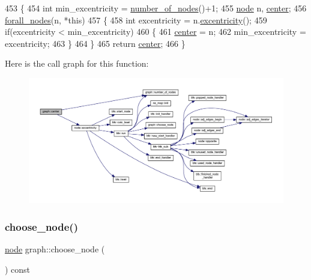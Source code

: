 \begin{DoxyCode}
453 \{
454     \textcolor{keywordtype}{int} min\_excentricity = \mbox{\hyperlink{classgraph_a42c78e0a9f115655e3ff0efe35ebfc4e}{number\_of\_nodes}}()+1;
455     \mbox{\hyperlink{classnode}{node}} n, \mbox{\hyperlink{classgraph_a351617e023b4b6833ab650a70fc086e7}{center}};
456     \mbox{\hyperlink{graph_8h_a1905bf4c6aa7167b9ee5a2e72f12ad2d}{forall\_nodes}}(n, *\textcolor{keyword}{this}) 
457     \{
458     \textcolor{keywordtype}{int} excentricity = n.\mbox{\hyperlink{classnode_aba6b3a48e7b951f08ebbbf3275f0ce9a}{excentricity}}();
459     \textcolor{keywordflow}{if}(excentricity < min\_excentricity) 
460     \{
461         \mbox{\hyperlink{classgraph_a351617e023b4b6833ab650a70fc086e7}{center}} = n;
462         min\_excentricity = excentricity;
463     \}
464     \}
465     \textcolor{keywordflow}{return} \mbox{\hyperlink{classgraph_a351617e023b4b6833ab650a70fc086e7}{center}};
466 \}
\end{DoxyCode}
Here is the call graph for this function\+:
\nopagebreak
\begin{figure}[H]
\begin{center}
\leavevmode
\includegraphics[width=350pt]{classgraph_a351617e023b4b6833ab650a70fc086e7_cgraph}
\end{center}
\end{figure}
\mbox{\label{classgraph_aec5c11c90a94ebd145f059a541db860e}} 
\subsubsection{\texorpdfstring{choose\+\_\+node()}{choose\_node()}}
{\footnotesize\ttfamily \mbox{\hyperlink{classnode}{node}} graph\+::choose\+\_\+node (\begin{DoxyParamCaption}{ }\end{DoxyParamCaption}) const\hspace{0.3cm}{\ttfamily [inherited]}}

